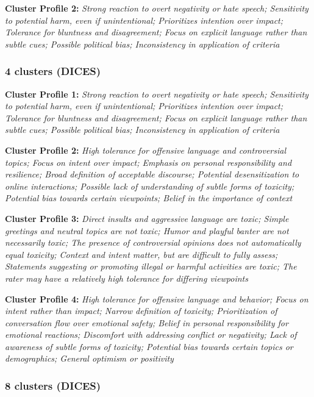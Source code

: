 \documentclass[11pt]{article}
\newcommand{\profiletext}[1]{\textit{#1}}
\begin{document}
\textbf{Cluster Profile 2:} \profiletext{Strong reaction to overt negativity or hate speech; Sensitivity to potential harm, even if unintentional; Prioritizes intention over impact; Tolerance for bluntness and disagreement; Focus on explicit language rather than subtle cues; Possible political bias; Inconsistency in application of criteria}

\subsubsection{4 clusters (DICES)}

\textbf{Cluster Profile 1:} \profiletext{Strong reaction to overt negativity or hate speech; Sensitivity to potential harm, even if unintentional; Prioritizes intention over impact; Tolerance for bluntness and disagreement; Focus on explicit language rather than subtle cues; Possible political bias; Inconsistency in application of criteria}

\textbf{Cluster Profile 2:} \profiletext{High tolerance for offensive language and controversial topics; Focus on intent over impact; Emphasis on personal responsibility and resilience; Broad definition of acceptable discourse; Potential desensitization to online interactions; Possible lack of understanding of subtle forms of toxicity; Potential bias towards certain viewpoints; Belief in the importance of context}

\textbf{Cluster Profile 3:} \profiletext{Direct insults and aggressive language are toxic; Simple greetings and neutral topics are not toxic; Humor and playful banter are not necessarily toxic; The presence of controversial opinions does not automatically equal toxicity; Context and intent matter, but are difficult to fully assess; Statements suggesting or promoting illegal or harmful activities are toxic; The rater may have a relatively high tolerance for differing viewpoints}

\textbf{Cluster Profile 4:} \profiletext{High tolerance for offensive language and behavior; Focus on intent rather than impact; Narrow definition of toxicity; Prioritization of conversation flow over emotional safety; Belief in personal responsibility for emotional reactions; Discomfort with addressing conflict or negativity; Lack of awareness of subtle forms of toxicity; Potential bias towards certain topics or demographics; General optimism or positivity}

\subsubsection{8 clusters (DICES)}
\end{document}
